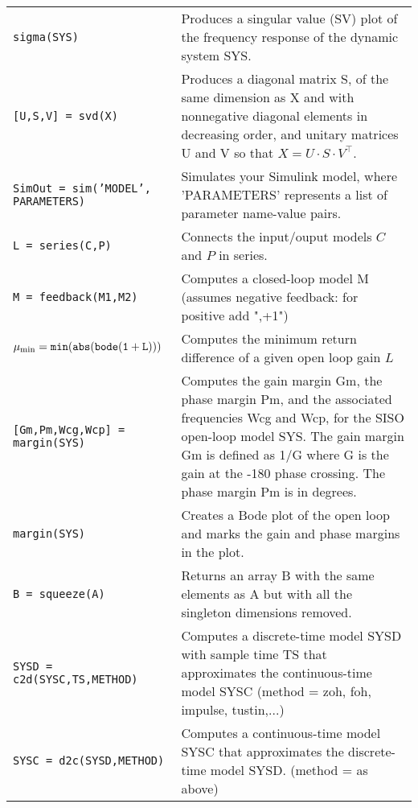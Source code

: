 \begin{center}
\begin{tabular}{p{5cm}|p{8cm}}
        \texttt{sigma(SYS)}  &  Produces a singular value (SV) plot of the frequency response of the dynamic system SYS.\\
        \texttt{[U,S,V] = svd(X)}  &  Produces a diagonal matrix S, of the same dimension as X and with nonnegative diagonal elements in decreasing order, and unitary matrices U and V so that $X = U\cdot S\cdot V^\top$.\\
        \texttt{SimOut = sim('MODEL', PARAMETERS)}  & Simulates your Simulink model, where 'PARAMETERS' represents a list of parameter name-value pairs. \\
        \texttt{L = series(C,P)}  & Connects the input/ouput models $C$ and $P$ in series. \\
        \texttt{M = feedback(M1,M2)}  &  Computes a closed-loop model M (assumes negative feedback: for positive add ",+1")\\
        $\mathtt{\mu_{\textnormal{min}} = min( abs(bode(1 + L)))}$  &  Computes the minimum return difference of a given open loop gain $L$\\
        \texttt{[Gm,Pm,Wcg,Wcp] = margin(SYS)}  & Computes the gain margin Gm, the phase margin Pm, and the associated frequencies Wcg and Wcp, for the SISO open-loop model SYS. The gain margin Gm is defined as 1/G where G is the gain at the -180 phase crossing. The phase margin Pm is in degrees. \\
        \texttt{margin(SYS)} & Creates a Bode plot of the open loop and marks the gain and phase margins in the plot. \\
        \texttt{B = squeeze(A)}  &  Returns an array B with the same elements as A but with all the singleton dimensions removed.\\
        \texttt{SYSD = c2d(SYSC,TS,METHOD)}  &  Computes a discrete-time model SYSD with sample time TS that approximates the continuous-time model SYSC (method = zoh, foh, impulse, tustin,...)\\
        \texttt{SYSC = d2c(SYSD,METHOD)} & Computes a continuous-time model SYSC that approximates the discrete-time model SYSD. (method = as above)
    \end{tabular}
\end{center}


\newpage

